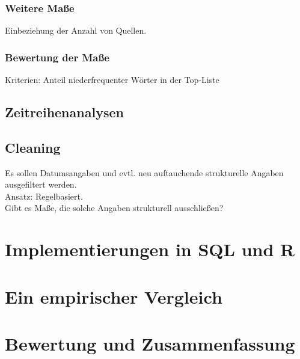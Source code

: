 \subsection{Weitere Maße}
Einbeziehung der Anzahl von Quellen.
\subsection{Bewertung der Ma\ss e}
Kriterien: Anteil niederfrequenter Wörter in der Top-Liste\\

\section{Zeitreihenanalysen}
\section{Cleaning}
Es sollen Datumsangaben und evtl. neu auftauchende strukturelle Angaben ausgefiltert werden.\\
Ansatz: Regelbasiert.\\
Gibt es Maße, die solche Angaben strukturell ausschließen?


\chapter{Implementierungen in SQL und R}
\chapter{Ein empirischer Vergleich}

\chapter{Bewertung und Zusammenfassung}











 
\nocite{*}%
 



